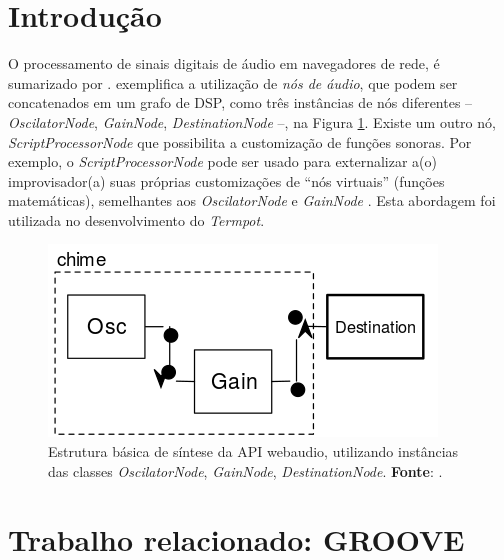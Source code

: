\section{Introdução}\label{sec:introducao}




O processamento de sinais digitais de áudio em navegadores de rede, é sumarizado por \cite{w3c_web_2012,roberts_web_2013-,wyse_viability_2014}. \cite{srikumar_tamming_2013} exemplifica a utilização de \emph{nós de áudio}, que podem ser concatenados em um grafo de DSP, como três instâncias de nós diferentes -- \emph{OscilatorNode}, \emph{GainNode}, \emph{DestinationNode} --, na Figura \ref{fig:shime}. Existe um outro nó, \emph{ScriptProcessorNode} que possibilita a customização de funções sonoras. Por exemplo, o \emph{ScriptProcessorNode} pode ser usado para externalizar a(o) improvisador(a) suas próprias customizações de ``nós virtuais'' (funções matemáticas), semelhantes aos \emph{OscilatorNode} e \emph{GainNode} . Esta abordagem foi utilizada no desenvolvimento do \emph{Termpot}.

\begin{figure}[h]
\centering
\includegraphics[scale=0.35]{chime.png}
\caption{Estrutura básica de síntese da API webaudio, utilizando instâncias das classes \emph{OscilatorNode}, \emph{GainNode}, \emph{DestinationNode}. \textbf{Fonte}: \cite{srikumar_tamming_2013}.}
\label{fig:shime}
\end{figure}

\section{Trabalho relacionado: GROOVE}


